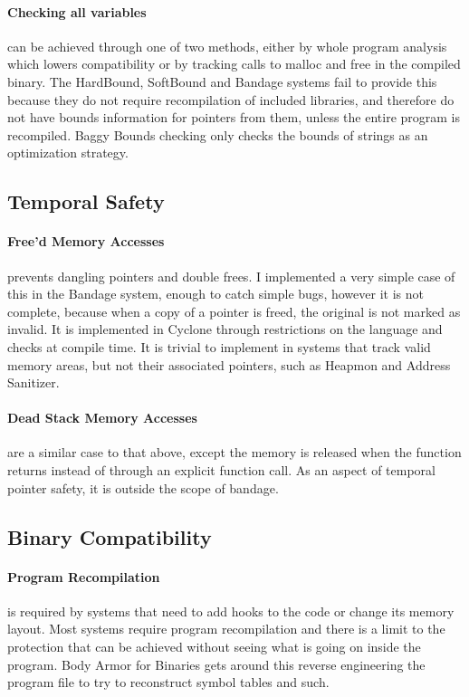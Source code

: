 \paragraph{Checking all variables} can be achieved through one of two methods, either by whole program analysis which lowers compatibility or by tracking calls to malloc and free in the compiled binary.
The HardBound, SoftBound and Bandage systems fail to provide this because they do not require recompilation of included libraries, and therefore do not have bounds information for pointers from them, unless the entire program is recompiled.
Baggy Bounds checking only checks the bounds of strings as an optimization strategy.

\subsection{Temporal Safety}

\paragraph{Free'd Memory Accesses} prevents dangling pointers and double frees.
I implemented a very simple case of this in the Bandage system, enough to catch simple bugs, however it is not complete, because when a copy of a pointer is freed, the original is not marked as invalid.
It is implemented in Cyclone through restrictions on the language and checks at compile time.
It is trivial to implement in systems that track valid memory areas, but not their associated pointers, such as Heapmon and Address Sanitizer.

\paragraph{Dead Stack Memory Accesses} are a similar case to that above, except the memory is released when the function returns instead of through an explicit function call.
As an aspect of temporal pointer safety, it is outside the scope of bandage.

\subsection{Binary Compatibility}

\paragraph{Program Recompilation} is required by systems that need to add hooks to the code or change its memory layout.
Most systems require program recompilation and there is a limit to the protection that can be achieved without seeing what is going on inside the program.
Body Armor for Binaries gets around this reverse engineering the program file to try to reconstruct symbol tables and such.

